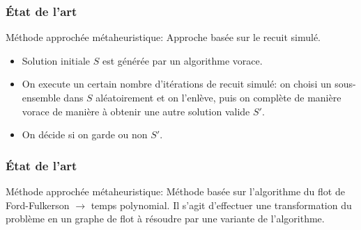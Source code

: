 \documentclass[aspectratio=169,11pt]{beamer}
\begin{document}
	\begin{frame}
		\frametitle{État de l'art}
		\begin{block}{Méthode approchée métaheuristique: \citeauthor{jacobs1995lsh}}
			Approche basée sur le recuit simulé.~\cite{jacobs1995lsh}
			\begin{itemize}
				\item Solution initiale \(S\) est générée par un algorithme vorace.
				\item On execute un certain nombre d'itérations de recuit simulé:
				on choisi un sous-ensemble dans \(S\) aléatoirement
				et on l'enlève, puis on complète de manière vorace de manière à obtenir une autre solution valide \(S'\).
				\item On décide si on garde ou non \(S'\).
			\end{itemize}
		\end{block}
	\end{frame}

	\begin{frame}
		\frametitle{État de l'art}
		\begin{block}{Méthode approchée métaheuristique: \citeauthor{Afif1995}}
			Méthode basée sur l'algorithme du flot de Ford-Fulkerson \(\rightarrow\) temps polynomial. Il s'agit d'effectuer une transformation du problème en un graphe de flot à résoudre par une variante de l'algorithme.~\cite{Afif1995}
		\end{block}
	\end{frame}

\end{document}
